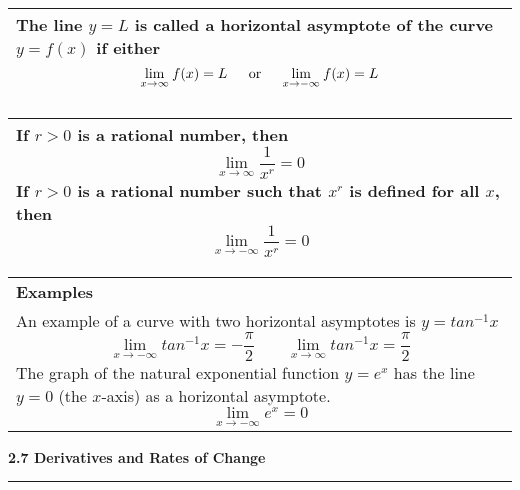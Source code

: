 \documentclass[fleqn]{article}
\begin{document}
\begin{center}
\def\arraystretch{1.3}
{\setlength{\tabcolsep}{16pt}
\begin{tabularx}{.9\textwidth}{|X|}
\hline
	\vspace{1pt}
	The line $y = L$ is called a \textbf{horizontal asymptote} of the curve $y = f(x)$ if either
	$$\underset{x \to \infty}{\lim} \: f(x) = L \text{\hspace{12pt} or \hspace{12pt}} \underset{x \to -\infty}{\lim} \: f(x) = L$$
	\\
	\hline
\end{tabularx}}
\vspace{12pt}

\def\arraystretch{1.3}
{\setlength{\tabcolsep}{16pt}
\begin{tabularx}{.9\textwidth}{|X|}
\hline
	\vspace{1pt}
	If $r > 0$ is a rational number, then 
	$$\underset{x \to \infty}{\lim} \dfrac{1}{x^r} = 0$$
	If $r > 0$ is a rational number such that $x^r$ is defined for all $x$, then
	$$\underset{x \to -\infty}{\lim} \dfrac{1}{x^r} = 0$$	
	\\
	\hline
\end{tabularx}}
\vspace{12pt}

\def\arraystretch{1.3}
{\setlength{\tabcolsep}{16pt}
\begin{tabularx}{.9\textwidth}{|X|}
\hline
	\vspace{1pt}
	\textbf{Examples} \\
	An example of a curve with two horizontal asymptotes is $y = tan^{-1} x$
	$$\underset{x \to -\infty}{\lim} tan^{-1} x = -\dfrac{\pi}{2} \hspace{24pt} \underset{x \to \infty}{\lim} tan^{-1} x = \dfrac{\pi}{2}$$
	The graph of the natural exponential function $y = e^x$ has the line $y=0$ (the $x$-axis) as a horizontal asymptote.
	$$\underset{x \to -\infty}{\lim} e^x = 0$$
	\\
	\hline
\end{tabularx}}
\vspace{12pt}

\Large\textbf{2.7 Derivatives and Rates of Change}

\noindent\hfill\rule{0.3\textwidth}{.4pt}\hfill
\vspace{12pt}


\end{center}
\end{document}
